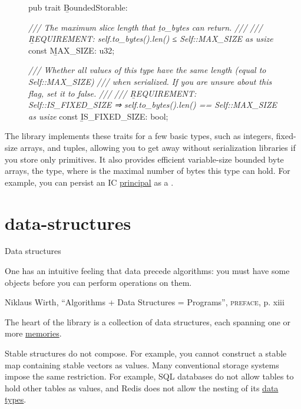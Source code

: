 \documentclass{article}
\begin{document}
\begin{figure}
\begin{code}[rust]
pub trait \label{bounded-storable-trait}\b{BoundedStorable}: \href{#storable-trait}{} {
    \emph{/// The maximum slice length that \b{to_bytes} can return.}
    \emph{///}
    \emph{/// \b{REQUIREMENT}: self.to_bytes().len() ≤ Self::MAX_SIZE as usize}
    const \b{MAX_SIZE}: u32;\label{max-size-attribute}

    \emph{/// Whether all values of this type have the same length (equal to Self::MAX_SIZE)}
    \emph{/// when serialized. If you are unsure about this flag, set it to \b{false}.}
    \emph{///}
    \emph{/// \b{REQUIREMENT}: Self::IS_FIXED_SIZE ⇒ self.to_bytes().len() == Self::MAX_SIZE as usize}
    const \b{IS_FIXED_SIZE}: bool;\label{is-fixed-size-attribute}
}
\end{code}
\end{figure}

The library implements these traits for a few basic types, such as integers, fixed-size arrays, and tuples, allowing you to get away without serialization libraries if you store only primitives.
It also provides efficient variable-size bounded byte arrays, the  type, where  is the maximal number of bytes this type can hold.
For example, you can persist an IC \href{https://internetcomputer.org/docs/current/references/ic-interface-spec#principal}{principal} as a .

\section{data-structures}{Data structures}
\epigraph{
    One has an intuitive feeling that data precede algorithms: you must have some objects before you can perform operations on them.
}{Niklaus Wirth, ``Algorithms + Data Structures = Programs'', \textsc{preface}, p. xiii}

The heart of the  library is a collection of data structures, each spanning one or more \href{#memory}{memories}.

Stable structures do not compose.
For example, you cannot construct a stable map containing stable vectors as values.
Many conventional storage systems impose the same restriction.
For example, SQL databases do not allow tables to hold other tables as values, and Redis does not allow the nesting of its \href{https://redis.io/docs/data-types/}{data types}.
\end{document}
